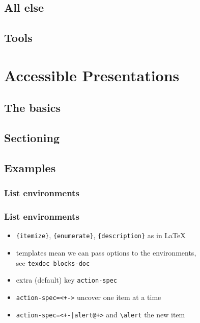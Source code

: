 \documentclass{ltx-talk}
\newcommand{\cs}[1]{\texttt{\textbackslash #1}}
\newcommand{\tubbraced}[1]{\texttt{\{#1\}}}
\begin{document}
\subsection{All else}
\subsection{Tools}
\section{Accessible Presentations}
\subsection{The basics}
\subsection{Sectioning}


\subsection{Examples}

\subsubsection{List environments}

\begin{frame*}
\frametitle{List environments}
\begin{itemize}
\item \tubbraced{itemize}, \tubbraced{enumerate}, \tubbraced{description}
as in \LaTeX
\item templates mean we can pass options to the environments,\\
see \texttt{texdoc blocks-doc}
\item extra (default) key \texttt{action-spec}
\item \verb!action-spec=<+->! \qquad uncover one item at a time %
\item \verb!action-spec=<+-|alert@+>!
\qquad and \alert{\cs{alert}} the new item
\end{itemize}
\end{frame*}
\end{document}
